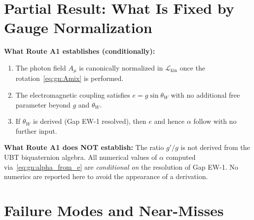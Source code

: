 \documentclass[12pt,a4paper]{article}
\theoremstyle{definition}
\theoremstyle{remark}
\begin{document}
\section{Partial Result: What Is Fixed by Gauge Normalization}
\label{sec:gn:partial}

\begin{resultbox}
\textbf{What Route A1 establishes (conditionally):}
\begin{enumerate}
  \item The photon field $A_\mu$ is canonically normalized in $\mathcal{L}_{\mathrm{kin}}$
        once the rotation~\eqref{eq:gn:Amix} is performed.
  \item The electromagnetic coupling satisfies $e = g\sin\theta_W$ with no additional
        free parameter beyond $g$ and $\theta_W$.
  \item If $\theta_W$ is derived (Gap EW-1 resolved), then $e$ and hence $\alpha$ follow
        with no further input.
\end{enumerate}
\end{resultbox}

\begin{warnbox}
\textbf{What Route A1 does NOT establish:}
The ratio $g'/g$ is not derived from the UBT biquaternion algebra.  All numerical
values of $\alpha$ computed via~\eqref{eq:gn:alpha_from_e} are \emph{conditional on}
the resolution of Gap EW-1.  No numerics are reported here to avoid the appearance
of a derivation.
\end{warnbox}

\section{Failure Modes and Near-Misses}
\label{sec:gn:failures}
\end{document}
